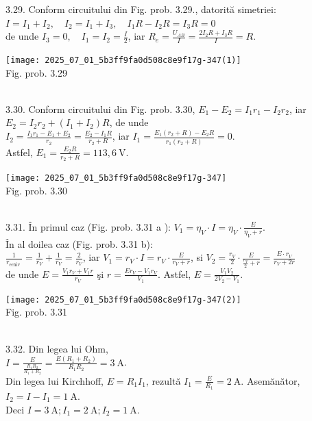 3.29. Conform circuitului din Fig. prob. 3.29., datorită simetriei:\\ $I=I_{1}+I_{2}, \quad I_{2}=I_{1}+I_{3}, \quad I_{1} R-I_{2} R=I_{3} R=0$\\ de unde $I_{3}=0, \quad I_{1}=I_{2}=\frac{I}{2}$, iar $R_{e}=\frac{U_{A B}}{I}=\frac{2 I_{2} R+I_{3} R}{I}=R$.\\ \begin{center} \texttt{[image: 2025\_07\_01\_5b3ff9fa0d508c8e9f17g-347(1)]}\\ Fig. prob. 3.29 \end{center}\\

3.30. Conform circuitului din Fig. prob. 3.30, $E_{1}-E_{2}=I_{1} r_{1}-I_{2} r_{2}$, iar $E_{2}=I_{2} r_{2}+\left(I_{1}+I_{2}\right) R$, de unde\\ $I_{2}=\frac{I_{1} r_{1}-E_{1}+E_{2}}{r_{2}}=\frac{E_{2}-I_{1} R}{r_{2}+R}$, iar $I_{1}=\frac{E_{1}\left(r_{2}+R\right)-E_{2} R}{r_{1}\left(r_{2}+R\right)}=0 $.\\ Astfel, $E_{1}=\frac{E_{2} R}{r_{2}+R}=113,6 \mathrm{~V}$.\\ \begin{center} \texttt{[image: 2025\_07\_01\_5b3ff9fa0d508c8e9f17g-347]}\\ Fig. prob. 3.30 \end{center}\\

3.31. În primul caz (Fig. prob. 3.31 a ): $V_{1}=\eta_{V} \cdot I=\eta_{V} \cdot \frac{E}{\eta_{V}+r}$.\\ În al doilea caz (Fig. prob. 3.31 b):\\ $\frac{1}{r_{\text {echiv }}}=\frac{1}{r_{V}}+\frac{1}{r_{V}}=\frac{2}{r_{V}}$, iar $V_{1}=r_{V} \cdot I=r_{V} \cdot \frac{E}{r_{V}+r}$, si $V_{2}=\frac{r_{V}}{2} \cdot \frac{E}{\frac{r_{V}}{2}+r}=\frac{E \cdot r_{V}}{r_{V}+2 r}$\\ de unde $E=\frac{V_{1} r_{V}+V_{1} r}{r_{V}}$ şi $r=\frac{E r_{V}-V_{1} r_{V}}{V_{1}}$. Astfel, $E=\frac{V_{1} V_{2}}{2 V_{2}-V_{1}}$.\\ \begin{center} \texttt{[image: 2025\_07\_01\_5b3ff9fa0d508c8e9f17g-347(2)]}\\ Fig. prob. 3.31 \end{center}\\

3.32. Din legea lui Ohm,\\ $I=\frac{E}{\frac{R_{1} R_{2}}{R_{1}+R_{2}}}=\frac{E\left(R_{1}+R_{2}\right)}{R_{1} R_{2}}=3 \mathrm{~A}$.\\ Din legea lui Kirchhoff, $E=R_{1} I_{1}$, rezultă $I_{1}=\frac{E}{R_{1}}=2 \mathrm{~A}$. Asemănător,\\ $I_{2}=I-I_{1}=1 \mathrm{~A}$.\\ Deci $I=3 \mathrm{~A} ; I_{1}=2 \mathrm{~A} ; I_{2}=1 \mathrm{~A}$.\\

